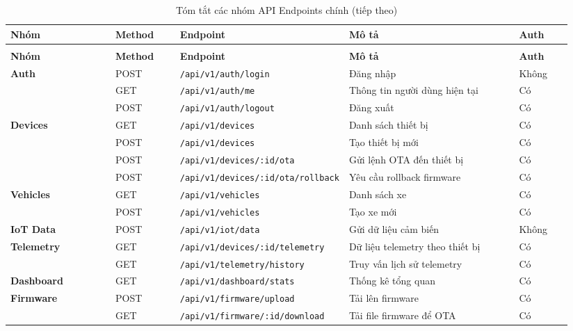 \documentclass[a4paper]{extarticle}
\newcommand{\thesissettableid}[2]{%
  \renewcommand{\thetable}{#1}%
  \renewcommand{\theHtable}{#2}%
}
\begin{document}
{\thesissettableid{3.22}{tab-ch3-tom-tat-cac-nhom-api-endpoints-chinh}
\def\LTcaptype{table}
\begin{longtable}{|L{0.200\linewidth}|L{0.122\linewidth}|L{0.181\linewidth}|L{0.340\linewidth}|L{0.101\linewidth}|}
\caption{Tóm tắt các nhóm API Endpoints chính}\label{tab:ch3-tom-tat-cac-nhom-api-endpoints-chinh}\\
\hline \textbf{Nhóm} & \textbf{Method} & \textbf{Endpoint} & \textbf{Mô tả} & \textbf{Auth} \\
\hline
\endfirsthead
\caption[]{Tóm tắt các nhóm API Endpoints chính (tiếp theo)}\\
\hline \textbf{Nhóm} & \textbf{Method} & \textbf{Endpoint} & \textbf{Mô tả} & \textbf{Auth} \\
\hline
\endhead
\hline
\endfoot
\endlastfoot
\textbf{Auth} & POST & \nolinkurl{/api/v1/auth/login} & Đăng nhập &
Không \\\hline
& GET & \nolinkurl{/api/v1/auth/me} & Thông tin người dùng hiện tại & Có \\\hline
& POST & \nolinkurl{/api/v1/auth/logout} & Đăng xuất & Có \\\hline
\textbf{Devices} & GET & \nolinkurl{/api/v1/devices} & Danh sách thiết bị & Có \\\hline
& POST & \nolinkurl{/api/v1/devices} & Tạo thiết bị mới & Có \\\hline
& POST & \nolinkurl{/api/v1/devices/:id/ota} & Gửi lệnh OTA đến thiết bị & Có \\\hline
& POST & \nolinkurl{/api/v1/devices/:id/ota/rollback} & Yêu cầu rollback firmware &
Có \\\hline
\textbf{Vehicles} & GET & \nolinkurl{/api/v1/vehicles} & Danh sách xe & Có \\\hline
& POST & \nolinkurl{/api/v1/vehicles} & Tạo xe mới & Có \\\hline
\textbf{IoT Data} & POST & \nolinkurl{/api/v1/iot/data} & Gửi dữ liệu cảm biến &
Không \\\hline
\textbf{Telemetry} & GET & \nolinkurl{/api/v1/devices/:id/telemetry} & Dữ liệu
telemetry theo thiết bị & Có \\\hline
& GET & \nolinkurl{/api/v1/telemetry/history} & Truy vấn lịch sử telemetry & Có \\\hline
\textbf{Dashboard} & GET & \nolinkurl{/api/v1/dashboard/stats} & Thống kê tổng quan
& Có \\\hline
\textbf{Firmware} & POST & \nolinkurl{/api/v1/firmware/upload} & Tải lên firmware &
Có \\\hline
& GET & \nolinkurl{/api/v1/firmware/:id/download} & Tải file firmware để OTA & Có \\\hline
\end{longtable}
}
\end{document}

